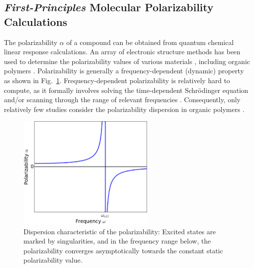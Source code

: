 \subsection{\textit{First-Principles} Molecular Polarizability Calculations}
\label{subsec:polarizability}
The polarizability $\alpha$ of a compound can be obtained from quantum chemical linear response calculations. An array of electronic structure methods has been used to determine the polarizability values of various materials \cite{Ando2006,Rocquefelte2004,Jensen1983,Rabah2003,Amrani2006,Reshak2014,Azam2013}, including organic polymers \cite{Ksianzou2006,Zeinalipour-Yazdi2008,Yu2007}. Polarizability is generally a frequency-dependent (\ie  dynamic) property as shown in Fig.\ \ref{fig:pol_wl}. Frequency-dependent polarizability is relatively hard to compute, as it formally involves solving the time-dependent Schr\"odinger equation and/or scanning through the range of relevant frequencies \cite{Rao2013}. Consequently, only relatively few studies consider the polarizability dispersion in organic polymers \cite{Rowan2011,Lenz2011}. 

\begin{figure}[htbp] 
	\centering
	\includegraphics[width=0.6\textwidth]{Chapter-2/Figures/RI_vs_freq.eps}
	\caption{Dispersion characteristic of the polarizability: Excited states are marked by singularities, and in the frequency range below, the polarizability converges asymptotically towards the constant static polarizability value.} 
	\label{fig:pol_wl} 
\end{figure}  

